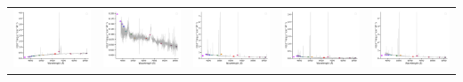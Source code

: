 \begin{center}
\begin{longtable}{l l l l l }
    \includegraphics[width=0.19\linewidth, clip]{Figs/Figs-sdss/spec-0289-51990-0542-SPLUS-n01s28-027608.pdf} & \includegraphics[width=0.19\linewidth, clip]{Figs/Figs-sdss/spec-0327-52294-0620-SPLUS-n02s19-022704.pdf} & \includegraphics[width=0.19\linewidth, clip]{Figs/Figs-sdss/spec-0329-52056-0529-SPLUS-n02s20-017833.pdf} & \includegraphics[width=0.19\linewidth, clip]{Figs/Figs-sdss/spec-0330-52370-0072-SPLUS-n03s22-026437.pdf} & \includegraphics[width=0.19\linewidth, clip]{Figs/Figs-sdss/spec-0330-52370-0131-SPLUS-n03s21-001338.pdf} \\

\end{longtable}
\end{center}
